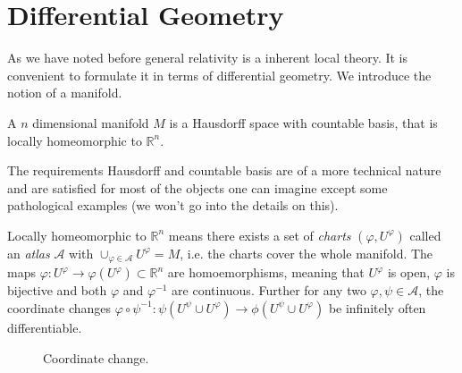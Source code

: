 \chapter{Differential Geometry}
As we have noted before general relativity is a inherent local theory. It is convenient to formulate it in terms of differential geometry.
We introduce the notion of a manifold.

\begin{definition}
A $n$ dimensional manifold $M$ is a Hausdorff space with countable basis, that
is locally homeomorphic to $\mathbb{R}^n$.
\end{definition}
\begin{remark}
The requirements Hausdorff and countable basis are of a more technical nature and are satisfied for most of the objects one can imagine 
except some pathological examples (we won't go into the details on this).

Locally homeomorphic to $\mathbb{R}^n$ means there exists a set of \emph{charts} 
$(\varphi,U^\varphi)$ called an \emph{atlas} $\mathcal{A}$ with $\cup_{\varphi\in\mathcal{A}} U^\varphi =M$, 
i.e. the charts cover the whole manifold. The maps $\varphi:U^\varphi\to \varphi(U^\varphi)\subset\mathbb{R}^n $ are homoemorphisms, 
meaning that $U^\varphi$ is open, $\varphi$ is bijective and both $\varphi$ and $\varphi^{-1}$ are continuous.
Further for any two $\varphi,\psi\in \mathcal{A}$, the coordinate changes 
$\varphi\circ\psi^{-1}:\psi(U^\psi\cup U^\varphi)\to \phi(U^\psi\cup U^\varphi)$ be infinitely often differentiable.
\end{remark}
\begin{figure}[htb]
    \begin{center}
    \end{center}
    \caption{Coordinate change.} %
\end{figure}


